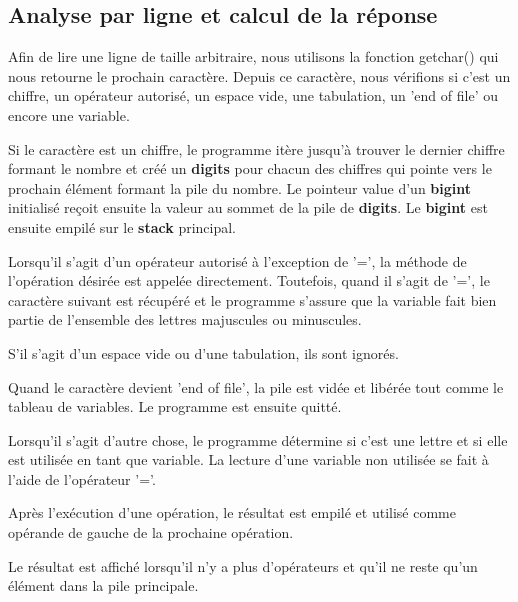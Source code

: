 \documentclass[]{report}
\begin{document}
	\begin{normalsize}
		\section*{\LARGE Analyse par ligne et calcul de la réponse}\vspace{4mm}
		Afin de lire une ligne de taille arbitraire, nous utilisons la fonction getchar() qui nous retourne le prochain caractère. Depuis ce caractère, nous vérifions si c'est un chiffre, un opérateur autorisé, un espace vide, une tabulation, un 'end of file' ou encore une variable.\vspace{4mm}
		\par Si le caractère est un chiffre, le programme itère jusqu'à trouver le dernier chiffre formant le nombre et créé un \textbf{digits} pour chacun des chiffres qui pointe vers le prochain élément formant la pile du nombre. Le pointeur value d'un \textbf{bigint} initialisé reçoit ensuite la valeur au sommet de la pile de \textbf{digits}. Le \textbf{bigint} est ensuite empilé sur le \textbf{stack} principal.
		\vspace{4mm}
		\par Lorsqu'il s'agit d'un opérateur autorisé à l'exception de '=', la méthode de l'opération désirée est appelée directement. Toutefois, quand il s'agit de '=', le caractère suivant est récupéré et le programme s'assure que la variable fait bien partie de l'ensemble des lettres majuscules ou minuscules.
		\vspace{4mm}
		\par S'il s'agit d'un espace vide ou d'une tabulation, ils sont ignorés.\vspace{4mm}
		\par Quand le caractère devient 'end of file', la pile est vidée et libérée tout comme le tableau de variables. Le programme est ensuite quitté.\vspace{4mm}
		\par Lorsqu'il s'agit d'autre chose, le programme détermine si c'est une lettre et si elle est utilisée en tant que variable. La lecture d'une variable non utilisée se fait à l'aide de l'opérateur '='.\vspace{4mm}
		\par Après l'exécution d'une opération, le résultat est empilé et utilisé comme opérande de gauche de la prochaine opération.\vspace{4mm}
		\par Le résultat est affiché lorsqu'il n'y a plus d'opérateurs et qu'il ne reste qu'un élément dans la pile principale.
		\vspace{4mm}
	\end{normalsize}
\end{document}
